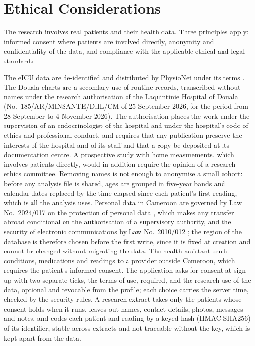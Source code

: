 \section{Ethical Considerations}\label{sec:ethics-considerations}\label{sec:ethics}\label{sec:legal}

The research involves real patients and their health data. Three principles apply: informed consent where patients are involved directly, anonymity and confidentiality of the data, and compliance with the applicable ethical and legal standards.

The eICU data are de-identified and distributed by PhysioNet under its terms \parencite{pollard2018,goldberger2000}. The Douala charts are a secondary use of routine records, transcribed without names under the research authorisation of the Laquintinie Hospital of Douala (No.~185/\allowbreak AR/\allowbreak MINSANTE/\allowbreak DHL/\allowbreak CM of 25 September 2026, for the period from 28 September to 4 November 2026). The authorisation places the work under the supervision of an endocrinologist of the hospital and under the hospital's code of ethics and professional conduct, and requires that any publication preserve the interests of the hospital and of its staff and that a copy be deposited at its documentation centre. A prospective study with home measurements, which involves patients directly, would in addition require the opinion of a research ethics committee. Removing names is not enough to anonymise a small cohort: before any analysis file is shared, ages are grouped in five-year bands and calendar dates replaced by the time elapsed since each patient's first reading, which is all the analysis uses. Personal data in Cameroon are governed by Law No.~2024/017 on the protection of personal data \parencite{cameroon2024data}, which makes any transfer abroad conditional on the authorisation of a supervisory authority, and the security of electronic communications by Law No.~2010/012 \parencite{cameroon2010cyber}; the region of the database is therefore chosen before the first write, since it is fixed at creation and cannot be changed without migrating the data. The health assistant sends conditions, medications and readings to a provider outside Cameroon, which requires the patient's informed consent. The application asks for consent at sign-up with two separate ticks, the terms of use, required, and the research use of the data, optional and revocable from the profile; each choice carries the server time, checked by the security rules. A research extract takes only the patients whose consent holds when it runs, leaves out names, contact details, photos, messages and notes, and codes each patient and reading by a keyed hash (HMAC-SHA256) of its identifier, stable across extracts and not traceable without the key, which is kept apart from the data.

